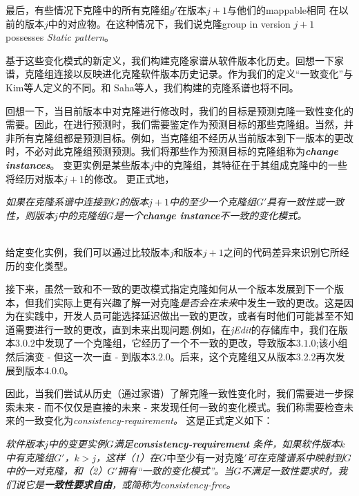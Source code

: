 最后，有些情况下克隆中的所有克隆组$ g'$在版本$ j + 1 $与他们的mappable相同
在以前的版本$ j $中的对应物。在这种情况下，我们说克隆group in version $ j + 1 $ possesses {\em  Static pattern}。

基于这些变化模式的新定义，我们构建克隆家谱从软件版本化历史。回想一下家谱，克隆组连接以反映进化克隆软件版本历史记录。作为我们的定义“一致变化”与Kim等人定义的不同。和 Saha等人，我们构建的克隆系谱也将不同。


回想一下，当目前版本中对克隆进行修改时，我们的目标是预测克隆一致性变化的需要。因此，在进行预测时，我们需要鉴定作为预测目标的那些克隆组。当然，并非所有克隆​​组都是预测目标。例如，当克隆组不经历从当前版本到下一版本的更改时，不必对此克隆组预测预测。我们将那些作为预测目标的克隆组称为{\em {\bf change instances}}。
变更实例是某些版本$ j $中的克隆组，其特征在于其组成克隆中的一些将经历对版本$ j + 1 $的修改。
更正式地，\\

\begin {definition} 
\label {}
{\em 如果在克隆系谱中连接到$ G $的版本$ j + 1 $中的至少一个克隆组$ G'$具有一致性或一致性，则版本$ j $中的克隆组$ G $是一个{\bf  change instance}不一致的变化模式。
}
\end {definition}

~\\
给定变化实例，我们可以通过比较版本$ j $和版本$ j + 1 $之间的代码差异来识别它所经历的变化类型。

接下来，虽然一致和不一致的更改模式指定克隆如何从一个版本发展到下一个版本，但我们实际上更有兴趣了解一对克隆{\em 是否会在未来}中发生一致的更改。这是因为在实践中，开发人员可能选择延迟做出一致的更改，或者有时他们可能甚至不知道需要进行一致的更改，直到未来出现问题.例如，在{\em  jEdit}的存储库中，我们在版本$ 3.0.2 $中发现了一个克隆组，它经历了一个不一致的更改，导致版本$ 3.1.0 $;该小组然后演变 - 但这一次一直 - 到版本$ 3.2.0 $。后来，这个克隆组又从版本$ 3.2.2 $再次发展到版本$ 4.0.0 $。

因此，当我们尝试从历史（通过家谱）了解克隆一致性变化时，我们需要进一步探索未来 - 而不仅仅是直接的未来 - 来发现任何一致的变化模式。我们称需要检查未来的一致变化为{\em consistency-requirement。}
这是正式定义如下：\\

\begin {definition} 
\label {defn-4}
{\em 
软件版本$ j $中的变更实例$ G $满足{\bf consistency-requirement }条件，如果软件版本$ k $中有克隆组$ G'$，$ k> j $，这样（1）在$ G中至少有一对克隆'$可在克隆谱系中映射到$ G $中的一对克隆，和（2）$ G'$拥有“一致的变化模式”。当$ G $不满足一致性要求时，我们说它是{\bf 一致性要求自由}，或简称为{\em consistency-free}。 
  }
\end {definition}

